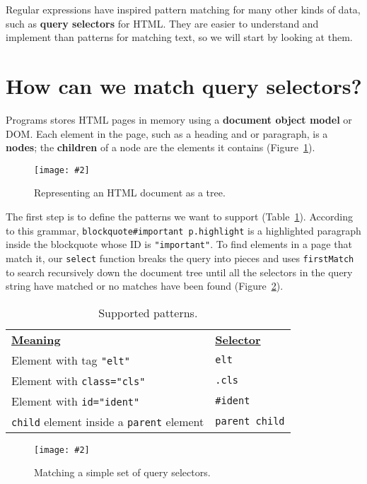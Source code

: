 \documentclass[krantzl]{krantz}
\newcommand{\figpdf}[4]{\begin{figure}%
\centering%
\texttt{[image: \#2]}%
\caption{#3}%
\label{#1}%
\end{figure}}
\newcommand{\figref}[1]{Figure~\ref{#1}}
\newcommand{\tblref}[1]{Table~\ref{#1}}
\newcommand{\glossref}[1]{\textbf{#1}}
\begin{document}
Regular expressions have inspired pattern matching for many other kinds of data,
such as \glossref{query selectors} for HTML.
They are easier to understand and implement than patterns for matching text,
so we will start by looking at them.

\section{How can we match query selectors?}\label{pattern-matching-selectors}


Programs stores HTML pages in memory using a \glossref{document object model} or DOM.
Each element in the page,
such as a heading and or paragraph,
is a \glossref{nodes};
the \glossref{children} of a node are the elements it contains
(\figref{pattern-matching-dom-tree}).

\figpdf{pattern-matching-dom-tree}{./pattern-matching/dom-tree.pdf}{Representing an HTML document as a tree.}{0.6}


The first step is to define the patterns we want to support
(\tblref{pattern-matching-supported}).
According to this grammar,
\texttt{blockquote\#important p.highlight} is a highlighted paragraph inside the blockquote whose ID is \texttt{"important"}.
To find elements in a page that match it,
our \texttt{select} function breaks the query into pieces
and uses \texttt{firstMatch} to search recursively down the document tree
until all the selectors in the query string have matched or no matches have been found
(\figref{pattern-matching-query-selectors}).

\begin{table}
\begin{tabular}{ll}
\textbf{\underline{Meaning}} & \textbf{\underline{Selector}} \\
Element with tag \texttt{"elt"} & \texttt{elt} \\
Element with \texttt{class="cls"} & \texttt{.cls} \\
Element with \texttt{id="ident"} & \texttt{\#ident} \\
\texttt{child} element inside a \texttt{parent} element & \texttt{parent child} \\
\end{tabular}
\caption{Supported patterns.}
\label{pattern-matching-supported}
\end{table}


\figpdf{pattern-matching-query-selectors}{./pattern-matching/query-selectors.pdf}{Matching a simple set of query selectors.}{0.6}
\end{document}
